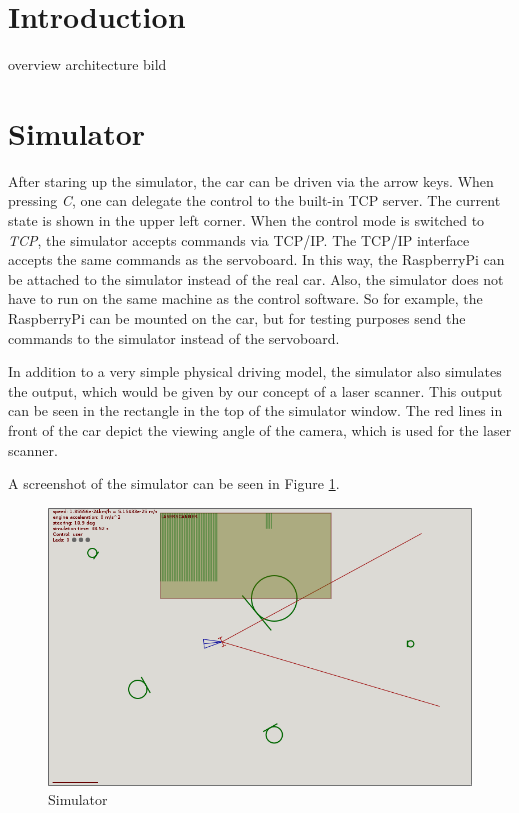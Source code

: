 \documentclass[12pt]{article}
\begin{document}
\maketitle

\begin{abstract}
\end{abstract}

\section{Introduction}

overview
architecture bild

\section{Simulator}


After staring up the simulator, the car can be driven via the arrow keys. When pressing \textit{C}, one can delegate the control to the built-in TCP server. The current state is shown in the upper left corner.
When the control mode is switched to \textit{TCP}, the simulator accepts commands via TCP/IP.
The TCP/IP interface accepts the same commands as the servoboard.
In this way, the RaspberryPi can be attached to the simulator instead of the real car.
Also, the simulator does not have to run on the same machine as the control software.
So for example, the RaspberryPi can be mounted on the car, but for testing purposes send the commands to the simulator instead of the servoboard.

In addition to a very simple physical driving model, the simulator also simulates the output, which would be given by our concept of a laser scanner. This output can be seen in the rectangle in the top of the simulator window. The red lines in front of the car depict the viewing angle of the camera, which is used for the laser scanner.

A screenshot of the simulator can be seen in Figure \ref{figsim}.

\begin{figure}[h]
\begin{center}
\includegraphics[width=15cm]{pic/sim.png}
\caption{Simulator}
\end{center}
\label{figsim}
\end{figure}
\end{document}
